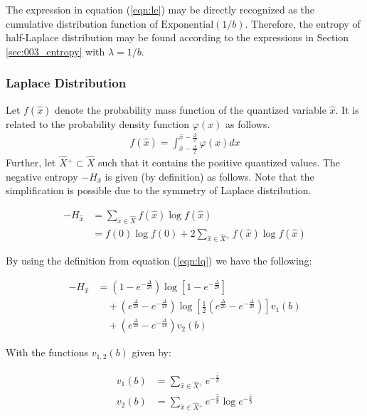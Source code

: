 The expression in equation (\ref{eqn:le}) may be directly recognized as the cumulative distribution function of $\text{Exponential}(1/b)$. Therefore, the entropy of half-Laplace distribution may be found according to the expressions in Section \ref{sec:003_entropy} with $\lambda = 1/b$. 

\subsubsection{Laplace Distribution}

Let $f(\hat{x})$ denote the probability mass function of the quantized variable $\hat{x}$. It is related to the probability density function $\varphi(x)$ as follows.
\begin{align} f(\hat{x}) = \int_{\hat{x} - \frac{\Delta}{2}}^{\hat{x} - \frac{\Delta}{2}} \varphi(x) dx \label{eqn:lq} \end{align}
Further, let $\hat{X}{}^+ \subset \hat{X}$ such that it contains the positive quantized values. The negative entropy $-H_{\hat{x}}$ is given (by definition) as follows. Note that the simplification is possible due to the symmetry of Laplace distribution.

\begin{align} -H_{\hat{x}} &= \sum_{\hat{x} \in \hat{X}} f(\hat{x}) \log f(\hat{x}) \\ &= f(0) \log f(0) + 2 \sum_{\hat{x} \in \hat{X}{}^+} f(\hat{x}) \log f(\hat{x}) \end{align}

By using the definition from equation (\ref{eqn:lq}) we have the following:

\begin{align} -H_{\hat{x}} &= \left(1 - e^{-\frac{\Delta}{2b}}\right) \log \left[1 - e^{-\frac{\Delta}{2b}} \right] \nonumber\\ &\quad +  \left(e^{\frac{\Delta}{2b}} - e^{-\frac{\Delta}{2b}}\right) \log \left[ \frac{1}{2} \left(e^{\frac{\Delta}{2b}} - e^{-\frac{\Delta}{2b}}\right) \right] v_1(b) \nonumber\\ &\quad + \left(e^{\frac{\Delta}{2b}} - e^{-\frac{\Delta}{2b}}\right) v_2(b) \end{align}

With the functions $v_{1,2}(b)$ given by:

\begin{align} v_1(b) &= \sum_{\hat{x} \in \hat{X}{}^+} e^{-\frac{\hat{x}}{b}} \\ v_2(b) &= \sum_{\hat{x} \in \hat{X}{}^+} e^{-\frac{\hat{x}}{b}} \log e^{-\frac{\hat{x}}{b}} \end{align}

